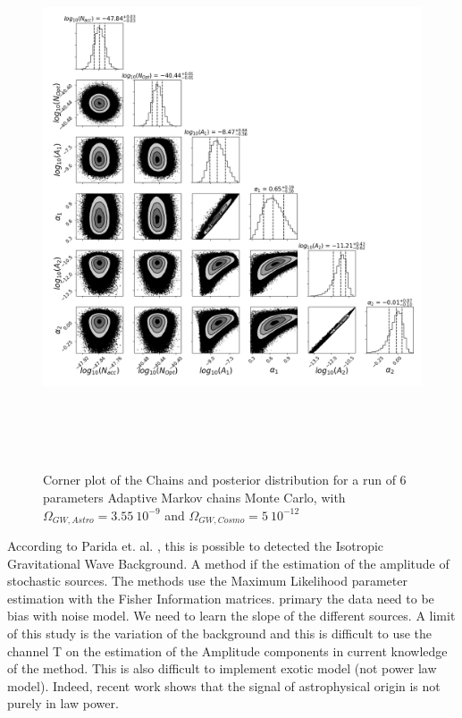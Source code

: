 \documentclass[a4paper,12pt]{article}
\begin{document}
\begin{figure}[H]
    \centering
    \includegraphics[height= 16cm]{FisherAET/2/corners.png}
    \caption{Corner plot of the Chains and posterior distribution for a run of 6 parameters Adaptive Markov chains Monte Carlo, with $\Omega_{GW,Astro} = 3.55 \ 10^{-9}$ and  $\Omega_{GW,Cosmo} = 5 \ 10^{-12}$}
    \label{fig:Corner6param2}
\end{figure}

According to Parida et. al. \cite{2016JCAP...04..024P}, this is possible to detected the Isotropic Gravitational Wave Background. A method if the estimation of the amplitude of stochastic sources. The methods use the Maximum Likelihood parameter estimation with the Fisher Information matrices. primary the data need to be bias with noise model. We need to learn the slope of the different sources. A limit of this study is the variation of the background and this is difficult to use the channel T on the estimation of the Amplitude components in current knowledge of the method. This is also difficult to implement exotic model (not power law model). Indeed, recent work shows that the signal of astrophysical origin is not purely in law power.
\end{document}

